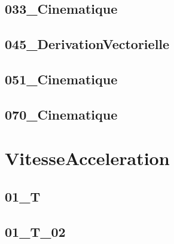 \subsection{033\_Cinematique}
\graphicspath{{../04-Cinématique/TD/033_Cinematique/images/}{../04-Cinématique/TD/033_Cinematique/}{../Style/png/}}


\subsection{045\_DerivationVectorielle}
\graphicspath{{../04-Cinématique/TD/045_DerivationVectorielle/images/}{../04-Cinématique/TD/045_DerivationVectorielle/}{../Style/png/}}


\subsection{051\_Cinematique}
\graphicspath{{../04-Cinématique/TD/051_Cinematique/images/}{../04-Cinématique/TD/051_Cinematique/}{../Style/png/}}


\subsection{070\_Cinematique}
\graphicspath{{../04-Cinématique/TD/070_Cinematique/images/}{../04-Cinématique/TD/070_Cinematique/}{../Style/png/}}


\section{VitesseAcceleration}

\subsection{01\_T}
\graphicspath{{../04-Cinématique/TD/VitesseAcceleration/01_T/images/}{../04-Cinématique/TD/VitesseAcceleration/01_T/}{../Style/png/}}


\subsection{01\_T\_02}
\graphicspath{{../04-Cinématique/TD/VitesseAcceleration/01_T_02/images/}{../04-Cinématique/TD/VitesseAcceleration/01_T_02/}{../Style/png/}}


